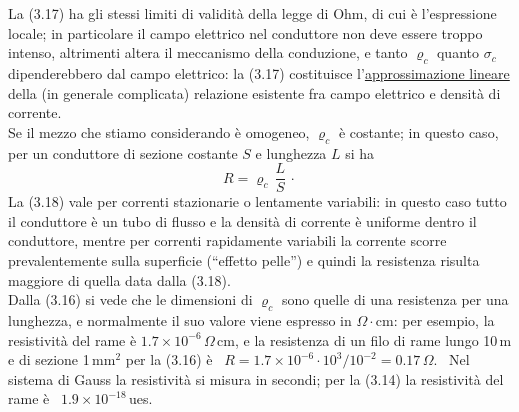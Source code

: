 La (3.17) ha gli stessi limiti di validit\`a della legge di Ohm, di cui \`e
l'espressione locale; in particolare il campo elettrico nel conduttore non deve
essere troppo intenso, altrimenti altera il meccanismo della conduzione, e tanto
$\varrho_c$ quanto $\sigma_c$ dipenderebbero dal campo elettrico: la (3.17)
costituisce l'\underline{approssimazione lineare} della (in generale complicata)
relazione esistente fra campo elettrico e densit\`a di corrente.\\
Se il mezzo che stiamo considerando \`e omogeneo, $\varrho_c$ \`e costante; in
questo caso, per un conduttore di sezione costante $S$ e lunghezza $L$ si ha
\begin{equation}
  R=\varrho_c\,\frac LS\,\cdot
  \tag{3.18}
\end{equation}
La (3.18) vale per correnti stazionarie o lentamente variabili: in questo caso
tutto il conduttore \`e un tubo di flusso e la densit\`a di corrente \`e
uniforme dentro il conduttore, mentre per correnti rapidamente variabili la
corrente scorre prevalentemente sulla superficie (``effetto pelle'') e quindi la
resistenza risulta maggiore di quella data dalla (3.18).\\
Dalla (3.16) si vede che le dimensioni di $\varrho_c$ sono quelle di una
resistenza per una lunghezza, e normalmente il suo valore viene espresso in
$\Omega\cdot$cm: per esempio, la resistivit\`a del rame \`e
$1.7\times10^{-6}\,\Omega\,$cm, e la resistenza di un filo di rame lungo 10\,m e
di sezione 1\,mm$^2$ per la (3.16) \`e
\ $R=1.7\times10^{-6}\cdot10^3/10^{-2}=0.17\,\Omega$. \ Nel sistema di Gauss la
resistivit\`a si misura in secondi; per la (3.14) la resistivit\`a del rame \`e
\ $1.9\times10^{-18}$\,ues.

